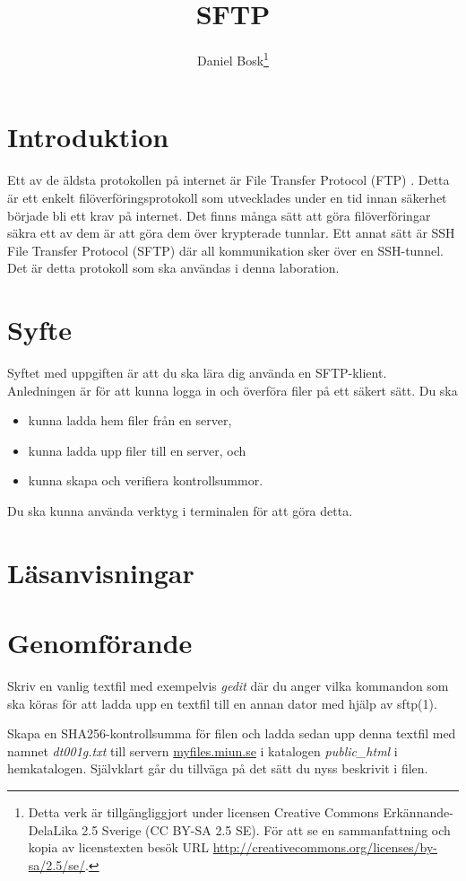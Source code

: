 \documentclass[a4paper,nocourse]{miunasgn}
\title{SFTP}
\author{Daniel Bosk\footnote{%
	Detta verk är tillgängliggjort under licensen Creative Commons 
	Erkännande-DelaLika 2.5 Sverige (CC BY-SA 2.5 SE).
	För att se en sammanfattning och kopia av licenstexten besök URL 
	\url{http://creativecommons.org/licenses/by-sa/2.5/se/}.
}}
\date{\svnId}
\begin{document}
\maketitle
\thispagestyle{foot}
\tableofcontents

\section{Introduktion}
\label{sec:Introduktion}
\noindent
Ett av de äldsta protokollen på internet är File Transfer Protocol (FTP) 
\citep{rfc959}.
Detta är ett enkelt filöverföringsprotokoll som utvecklades under en tid innan 
säkerhet började bli ett krav på internet.
Det finns många sätt att göra filöverföringar säkra ett av dem är att göra dem 
över krypterade tunnlar.
Ett annat sätt är SSH File Transfer Protocol (SFTP) där all kommunikation sker 
över en SSH-tunnel.
Det är detta protokoll som ska användas i denna laboration.


\section{Syfte}
\label{sec:Syfte}
\noindent
Syftet med uppgiften är att du ska lära dig använda en SFTP-klient.
Anledningen är för att kunna logga in och överföra filer på ett säkert sätt.
Du ska
\begin{itemize}
	\item kunna ladda hem filer från en server,
	\item kunna ladda upp filer till en server, och
	\item kunna skapa och verifiera kontrollsummor.
\end{itemize}
Du ska kunna använda verktyg i terminalen för att göra detta.


\section{Läsanvisningar}
\label{sec:Lasanvisningar}
\noindent



\section{Genomförande}
\label{sec:Genomforande}
\noindent
Skriv en vanlig textfil med exempelvis \emph{gedit} där du anger vilka 
kommandon som ska köras för att ladda upp en textfil till en annan dator med 
hjälp av sftp(1).

Skapa en SHA256-kontrollsumma för filen och ladda sedan upp denna textfil med 
namnet \emph{dt001g.txt} till servern \url{myfiles.miun.se} i katalogen 
\emph{public\_html} i hemkatalogen.
Självklart går du tillväga på det sätt du nyss beskrivit i filen.
\end{document}
